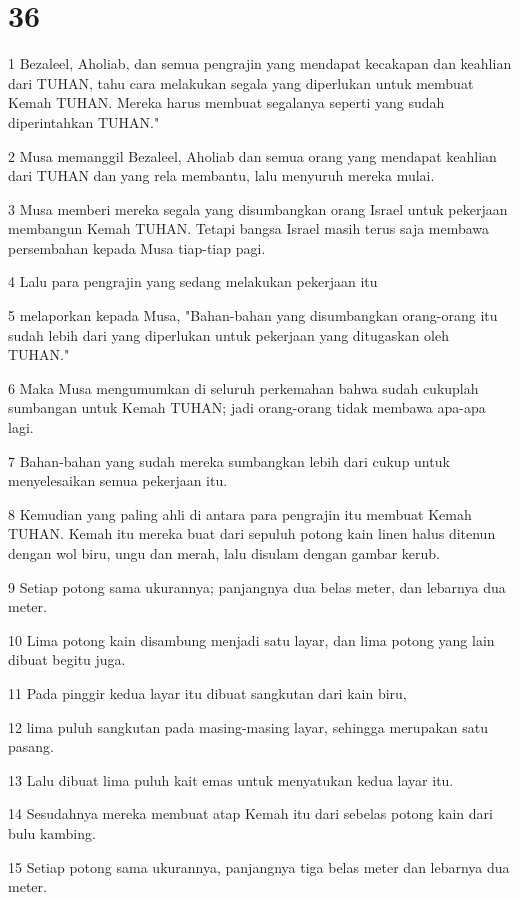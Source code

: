 \chapter{36}

\par 1 Bezaleel, Aholiab, dan semua pengrajin yang mendapat kecakapan dan keahlian dari TUHAN, tahu cara melakukan segala yang diperlukan untuk membuat Kemah TUHAN. Mereka harus membuat segalanya seperti yang sudah diperintahkan TUHAN."
\par 2 Musa memanggil Bezaleel, Aholiab dan semua orang yang mendapat keahlian dari TUHAN dan yang rela membantu, lalu menyuruh mereka mulai.
\par 3 Musa memberi mereka segala yang disumbangkan orang Israel untuk pekerjaan membangun Kemah TUHAN. Tetapi bangsa Israel masih terus saja membawa persembahan kepada Musa tiap-tiap pagi.
\par 4 Lalu para pengrajin yang sedang melakukan pekerjaan itu
\par 5 melaporkan kepada Musa, "Bahan-bahan yang disumbangkan orang-orang itu sudah lebih dari yang diperlukan untuk pekerjaan yang ditugaskan oleh TUHAN."
\par 6 Maka Musa mengumumkan di seluruh perkemahan bahwa sudah cukuplah sumbangan untuk Kemah TUHAN; jadi orang-orang tidak membawa apa-apa lagi.
\par 7 Bahan-bahan yang sudah mereka sumbangkan lebih dari cukup untuk menyelesaikan semua pekerjaan itu.
\par 8 Kemudian yang paling ahli di antara para pengrajin itu membuat Kemah TUHAN. Kemah itu mereka buat dari sepuluh potong kain linen halus ditenun dengan wol biru, ungu dan merah, lalu disulam dengan gambar kerub.
\par 9 Setiap potong sama ukurannya; panjangnya dua belas meter, dan lebarnya dua meter.
\par 10 Lima potong kain disambung menjadi satu layar, dan lima potong yang lain dibuat begitu juga.
\par 11 Pada pinggir kedua layar itu dibuat sangkutan dari kain biru,
\par 12 lima puluh sangkutan pada masing-masing layar, sehingga merupakan satu pasang.
\par 13 Lalu dibuat lima puluh kait emas untuk menyatukan kedua layar itu.
\par 14 Sesudahnya mereka membuat atap Kemah itu dari sebelas potong kain dari bulu kambing.
\par 15 Setiap potong sama ukurannya, panjangnya tiga belas meter dan lebarnya dua meter.
